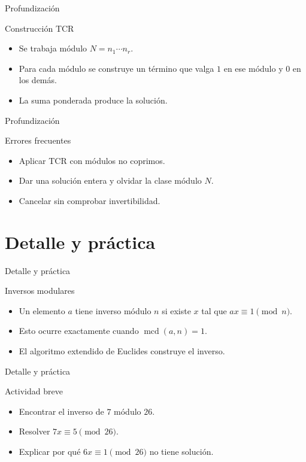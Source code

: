 \documentclass[aspectratio=169,11pt]{beamer}
\newcommand{\mcd}{\operatorname{mcd}}
\begin{document}
\begin{frame}{Profundización}
\begin{block}{Construcción TCR}
\begin{itemize}
  \item Se trabaja módulo \(N=n_1\cdots n_r\).
  \item Para cada módulo se construye un término que valga \(1\) en ese módulo y \(0\) en los demás.
  \item La suma ponderada produce la solución.
\end{itemize}
\end{block}
\end{frame}

\begin{frame}{Profundización}
\begin{block}{Errores frecuentes}
\begin{itemize}
  \item Aplicar TCR con módulos no coprimos.
  \item Dar una solución entera y olvidar la clase módulo \(N\).
  \item Cancelar sin comprobar invertibilidad.
\end{itemize}
\end{block}
\end{frame}


\section{Detalle y práctica}

\begin{frame}{Detalle y práctica}
\begin{block}{Inversos modulares}
\begin{itemize}
  \item Un elemento \(a\) tiene inverso módulo \(n\) si existe \(x\) tal que \(ax\equiv 1\pmod n\).
  \item Esto ocurre exactamente cuando \(\mcd(a,n)=1\).
  \item El algoritmo extendido de Euclides construye el inverso.
\end{itemize}
\end{block}
\end{frame}

\begin{frame}{Detalle y práctica}
\begin{block}{Actividad breve}
\begin{itemize}
  \item Encontrar el inverso de \(7\) módulo \(26\).
  \item Resolver \(7x\equiv 5\pmod {26}\).
  \item Explicar por qué \(6x\equiv 1\pmod {26}\) no tiene solución.
\end{itemize}
\end{block}
\end{frame}
\end{document}
